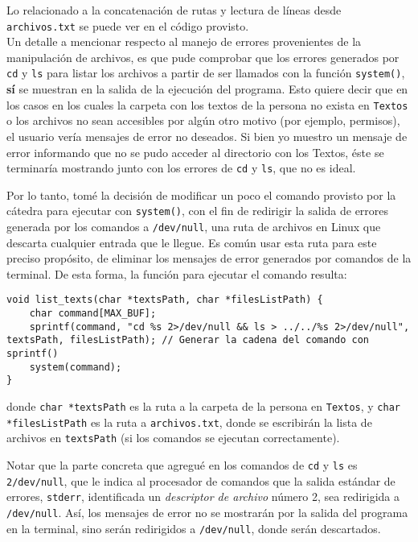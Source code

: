 \documentclass[a4paper]{article}
\begin{document}
Lo relacionado a la concatenación de rutas y lectura de líneas desde \texttt{archivos.txt} se puede ver en el código provisto. \\

Un detalle a mencionar respecto al manejo de errores provenientes de la manipulación de archivos, es que pude comprobar que los errores generados por \texttt{cd} y \texttt{ls} para listar los archivos a partir de ser llamados con la función \texttt{system()}, \textbf{sí} se muestran en la salida de la ejecución del programa. Esto quiere decir que en los casos en los cuales la carpeta con los textos de la persona no exista en \texttt{Textos} o los archivos no sean accesibles por algún otro motivo (por ejemplo, permisos), el usuario vería mensajes de error no deseados. Si bien yo muestro un mensaje de error informando que no se pudo acceder al directorio con los Textos, éste se terminaría mostrando junto con los errores de \texttt{cd} y \texttt{ls}, que no es ideal.

Por lo tanto, tomé la decisión de modificar un poco el comando provisto por la cátedra para ejecutar con \texttt{system()}, con el fin de redirigir la salida de errores generada por los comandos a \texttt{/dev/null}, una ruta de archivos en Linux que descarta cualquier entrada que le llegue. Es común usar esta ruta para este preciso propósito, de eliminar los mensajes de error generados por comandos de la terminal. De esta forma, la función para ejecutar el comando resulta:

\begin{verbatim}
void list_texts(char *textsPath, char *filesListPath) {
    char command[MAX_BUF];
    sprintf(command, "cd %s 2>/dev/null && ls > ../../%s 2>/dev/null", textsPath, filesListPath); // Generar la cadena del comando con sprintf()
    system(command);
}
\end{verbatim}

\noindent donde \texttt{char *textsPath} es la ruta a la carpeta de la persona en \texttt{Textos}, y \texttt{char *filesListPath} es la ruta a \texttt{archivos.txt}, donde se escribirán la lista de archivos en \texttt{textsPath} (si los comandos se ejecutan correctamente).

Notar que la parte concreta que agregué en los comandos de \texttt{cd} y \texttt{ls} es \texttt{2/dev/null}, que le indica al procesador de comandos que la salida estándar de errores, \texttt{stderr}, identificada un \textit{descriptor de archivo} número 2, sea redirigida a \texttt{/dev/null}. Así, los mensajes de error no se mostrarán por la salida del programa en la terminal, sino serán redirigidos a \texttt{/dev/null}, donde serán descartados. 
\end{document}
